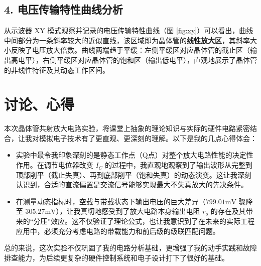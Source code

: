 \documentclass[10.5pt]{config}
\begin{document}
\subsection*{4. 电压传输特性曲线分析}
从示波器 XY 模式观察并记录的电压传输特性曲线（图 \ref{fig:xy}）可以看出，曲线中间部分为一条斜率较大的近似直线，该区域即为晶体管的\textbf{线性放大区}，其斜率大小反映了电压放大倍数。曲线两端趋于平缓：左侧平缓区对应晶体管的截止区（输出高电平），右侧平缓区对应晶体管的饱和区（输出低电平），直观地展示了晶体管的非线性特征及其动态工作区间。


\section{讨论、心得}

本次晶体管共射放大电路实验，将课堂上抽象的理论知识与实际的硬件电路紧密结合，让我对模拟电子技术有了更直观、更深刻的理解。以下是我的几点心得体会：

\begin{itemize}[leftmargin=2em]
    \item 实验中最令我印象深刻的是静态工作点（Q点）对整个放大电路性能的决定性作用。在调节电位器改变 $I_C$ 的过程中，我直观地观察到了输出波形从完整到顶部削平（截止失真）、再到底部削平（饱和失真）的动态演变。这让我深刻认识到，合适的直流偏置是交流信号能够实现最大不失真放大的先决条件。
    
    \item 在测量动态指标时，空载与带载状态下输出电压的巨大差异（$799.01\mathrm{mV}$ 骤降至 $305.27\mathrm{mV}$），让我真切地感受到了放大电路本身输出电阻 $r_o$ 的存在及其带来的“分压”效应。这不仅验证了理论公式，也让我意识到了在未来的实际工程应用中，必须充分考虑电路的带载能力和前后级的级联匹配问题。
\end{itemize}

总的来说，这次实验不仅巩固了我的电路分析基础，更增强了我的动手实践和故障排查能力，为后续更复杂的硬件控制系统和电子设计打下了很好的基础。
\end{document}
